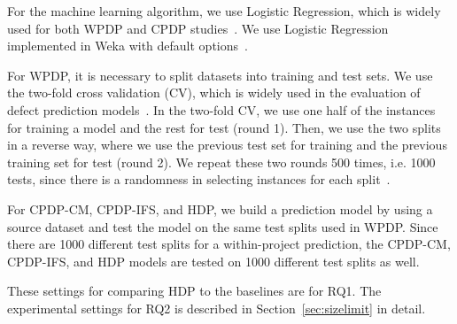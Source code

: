 For the machine learning algorithm, we use Logistic Regression, which is widely
used for both WPDP and CPDP
studies~\cite{Meneely2008,Nam13,Shihab11,Zimmermann09}.
We use Logistic Regression implemented in Weka with default
options~\cite{Weka}.

For WPDP, it is necessary to split datasets into training and test
sets. We use the two-fold cross validation (CV), which is widely used in the evaluation of
defect prediction models~\cite{Klas2010,Nam13,Pinzger2008}. In the two-fold CV, we use one half of the instances for training a model and the rest for
test (round 1). Then, we use the two splits in a reverse way, where we
use the previous test set for training and the previous training set for test
(round 2). We repeat these two rounds 500 times, i.e. 1000 tests, since there
is a randomness in selecting instances for each split~\cite{Arcuri11}.

For CPDP-CM, CPDP-IFS, and HDP, we build a 
prediction model by using a source dataset and test the model on the same test
splits used in WPDP. Since there are 1000 different test
splits for a within-project prediction, the CPDP-CM, CPDP-IFS, and HDP models
are tested on 1000 different test splits as well.

These settings for comparing HDP to the baselines are for RQ1. The experimental settings for RQ2 is described in Section~\ref{sec:sizelimit} in detail.

